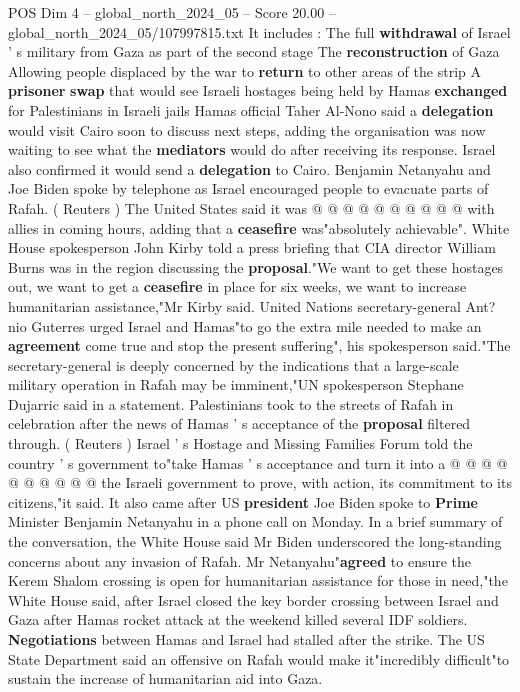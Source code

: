 \begin{textsample}{POS Dim 4 – global\_north\_2024\_05 – Score 20.00 – global\_north\_2024\_05/107997815.txt}
It includes : The full \textbf{withdrawal} of Israel ' s military from Gaza as part of the second stage The \textbf{reconstruction} of Gaza Allowing people displaced by the war to \textbf{return} to other areas of the strip A \textbf{prisoner} \textbf{swap} that would see Israeli hostages being held by Hamas \textbf{exchanged} for Palestinians in Israeli jails Hamas official Taher Al-Nono said a \textbf{delegation} would visit Cairo soon to discuss next steps, adding the organisation was now waiting to see what the \textbf{mediators} would do after receiving its response.
Israel also confirmed it would send a \textbf{delegation} to Cairo.
Benjamin Netanyahu and Joe Biden spoke by telephone as Israel encouraged people to evacuate parts of Rafah. ( Reuters ) The United States said it was @ @ @ @ @ @ @ @ @ @ with allies in coming hours, adding that a \textbf{ceasefire} was"absolutely achievable".
White House spokesperson John Kirby told a press briefing that CIA director William Burns was in the region discussing the \textbf{proposal}."We want to get these hostages out, we want to get a \textbf{ceasefire} in place for six weeks, we want to increase humanitarian assistance,"Mr Kirby said.
United Nations secretary-general Ant? nio Guterres urged Israel and Hamas"to go the extra mile needed to make an \textbf{agreement} come true and stop the present suffering", his spokesperson said."The secretary-general is deeply concerned by the indications that a large-scale military operation in Rafah may be imminent,"UN spokesperson Stephane Dujarric said in a statement.
Palestinians took to the streets of Rafah in celebration after the news of Hamas ' s acceptance of the \textbf{proposal} filtered through. ( Reuters ) Israel ' s Hostage and Missing Families Forum told the country ' s government to"take Hamas ' s acceptance and turn it into a @ @ @ @ @ @ @ @ @ @ the Israeli government to prove, with action, its commitment to its citizens,"it said.
It also came after US \textbf{president} Joe Biden spoke to \textbf{Prime} Minister Benjamin Netanyahu in a phone call on Monday.
In a brief summary of the conversation, the White House said Mr Biden underscored the long-standing concerns about any invasion of Rafah.
Mr Netanyahu"\textbf{agreed} to ensure the Kerem Shalom crossing is open for humanitarian assistance for those in need,"the White House said, after Israel closed the key border crossing between Israel and Gaza after Hamas rocket attack at the weekend killed several IDF soldiers. \textbf{Negotiations} between Hamas and Israel had stalled after the strike.
The US State Department said an offensive on Rafah would make it"incredibly difficult"to sustain the increase of humanitarian aid into Gaza.

\end{textsample}
